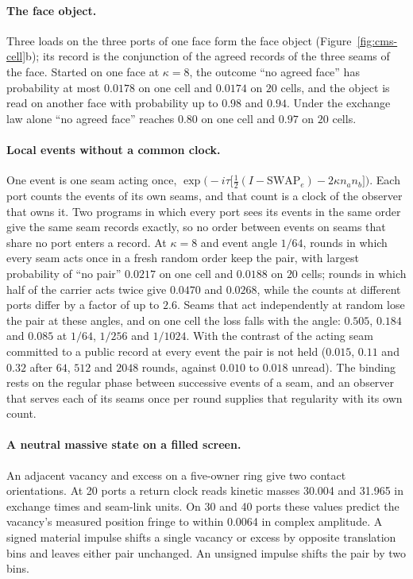\paragraph{The face object.}
Three loads on the three ports of one face form the face object
(Figure~\ref{fig:cms-cell}b); its record is the conjunction of the agreed records of the
three seams of the face. Started on one face at $\kappa=8$, the outcome ``no agreed face''
has probability at most $0.0178$ on one cell and $0.0174$ on $20$ cells, and the object is
read on another face with probability up to $0.98$ and $0.94$. Under the exchange law alone
``no agreed face'' reaches $0.80$ on one cell and $0.97$ on $20$ cells.

\paragraph{Local events without a common clock.}
One event is one seam acting once,
$\exp\bigl(-i\tau\bigl[\tfrac12(I-\mathrm{SWAP}_e)-2\kappa n_an_b\bigr]\bigr)$. Each port
counts the events of its own seams, and that count is a clock of the observer that owns
it. Two programs in which every port sees its events in the same order give the same seam
records exactly, so no order between events on seams that share no port enters a record. At
$\kappa=8$ and event angle $1/64$, rounds in which every seam acts once in a fresh random
order keep the pair, with largest probability of ``no pair'' $0.0217$ on one cell and
$0.0188$ on $20$ cells; rounds in which half of the carrier acts twice give $0.0470$ and
$0.0268$, while the counts at different ports differ by a factor of up to $2.6$. Seams that
act independently at random lose the pair at these angles, and on one cell the
loss falls with the angle: $0.505$, $0.184$ and $0.085$ at $1/64$, $1/256$ and $1/1024$.
With the contrast of the acting seam committed to a public record at every event the pair
is not held ($0.015$, $0.11$ and $0.32$ after $64$, $512$ and $2048$ rounds, against $0.010$
to $0.018$ unread). The binding rests on the regular phase between successive events of a
seam, and an observer that serves each of its seams once per round supplies that
regularity with its own count.

\paragraph{A neutral massive state on a filled screen.}
An adjacent vacancy and excess on a five-owner ring give two contact
orientations. At 20 ports a return clock reads kinetic masses 30.004 and
31.965 in exchange times and seam-link units. On 30 and 40 ports these
values predict the vacancy's measured position fringe to within 0.0064
in complex amplitude. A signed material impulse shifts a single vacancy or
excess by opposite translation bins and leaves either pair unchanged.
An unsigned impulse shifts the pair by two bins.

